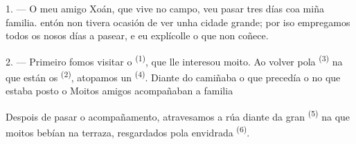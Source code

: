 %
%

\VUsaut{4.0mm}
\VUsaut{3.0mm}

\VUsaut{3.0mm}

1. --- O meu amigo Xoán, que vive no campo, veu pasar tres días coa miña familia.
 entón non tivera ocasión de ver unha cidade grande; por iso empregamos
todos os nosos días a pasear, e eu explícolle o que non coñece.

2. --- Primeiro fomos visitar o  \textsuperscript{(1)}, que lle
interesou moito. Ao volver pola  \textsuperscript{(3)} na que están os
 \textsuperscript{(2)}, atopamos un 
\textsuperscript{(4)}. Diante do  camiñaba o 
que precedía o  no que estaba posto o 
Moitos amigos acompañaban a familia 

Despois de pasar o acompañamento, atravesamos a rúa diante da gran 
\textsuperscript{(5)} na que moitos  bebían  na
terraza, resgardados pola  envidrada \textsuperscript{(6)}.

